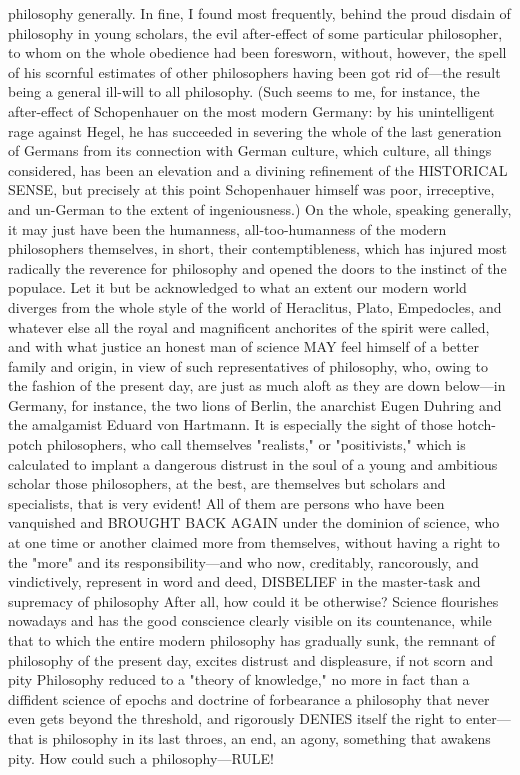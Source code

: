 \documentclass[12pt]{article}
\begin{document}
philosophy generally. In fine, I found most frequently, behind the proud disdain of philosophy in young scholars, the evil after-effect of some particular philosopher, to whom on the whole obedience had been foresworn, without, however, the spell of his scornful estimates of other philosophers having been got rid of---the result being a general ill-will to all philosophy. (Such seems to me, for instance, the after-effect of Schopenhauer on the most modern Germany: by his unintelligent rage against Hegel, he has succeeded in severing the whole of the last generation of Germans from its connection with German culture, which culture, all things considered, has been an elevation and a divining refinement of the HISTORICAL SENSE, but precisely at this point Schopenhauer himself was poor, irreceptive, and un-German to the extent of ingeniousness.) On the whole, speaking generally, it may just have been the humanness, all-too-humanness of the modern philosophers themselves, in short, their contemptibleness, which has injured most radically the reverence for philosophy and opened the doors to the instinct of the populace. Let it but be acknowledged to what an extent our modern world diverges from the whole style of the world of Heraclitus, Plato, Empedocles, and whatever else all the royal and magnificent anchorites of the spirit were called, and with what justice an honest man of science MAY feel himself of a better family and origin, in view of such representatives of philosophy, who, owing to the fashion of the present day, are just as much aloft as they are down below---in Germany, for instance, the two lions of Berlin, the anarchist Eugen Duhring and the amalgamist Eduard von Hartmann. It is especially the sight of those hotch-potch philosophers, who call themselves "realists," or "positivists," which is calculated to implant a dangerous distrust in the soul of a young and ambitious scholar those philosophers, at the best, are themselves but scholars and specialists, that is very evident! All of them are persons who have been vanquished and BROUGHT BACK AGAIN under the dominion of science, who at one time or another claimed more from themselves, without having a right to the "more" and its responsibility---and who now, creditably, rancorously, and vindictively, represent in word and deed, DISBELIEF in the master-task and supremacy of philosophy After all, how could it be otherwise? Science flourishes nowadays and has the good conscience clearly visible on its countenance, while that to which the entire modern philosophy has gradually sunk, the remnant of philosophy of the present day, excites distrust and displeasure, if not scorn and pity Philosophy reduced to a "theory of knowledge," no more in fact than a diffident science of epochs and doctrine of forbearance a philosophy that never even gets beyond the threshold, and rigorously DENIES itself the right to enter---that is philosophy in its last throes, an end, an agony, something that awakens pity. How could such a philosophy---RULE!
\end{document}
